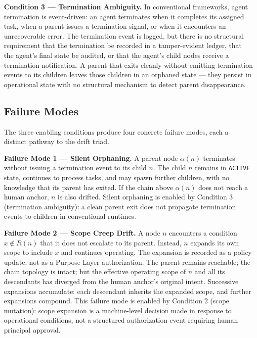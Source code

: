 \medskip
\noindent\textbf{Condition 3 — Termination Ambiguity.}
In conventional frameworks, agent termination is event-driven: an agent terminates when it completes its assigned task, when a parent issues a termination signal, or when it encounters an unrecoverable error. The termination event is logged, but there is no structural requirement that the termination be recorded in a tamper-evident ledger, that the agent's final state be audited, or that the agent's child nodes receive a termination notification. A parent that exits cleanly without emitting termination events to its children leaves those children in an orphaned state — they persist in operational state with no structural mechanism to detect parent disappearance.

\subsection{Failure Modes}
\label{sec:drift-failure-modes}

The three enabling conditions produce four concrete failure modes, each a distinct pathway to the drift triad.

\medskip
\noindent\textbf{Failure Mode 1 — Silent Orphaning.}
A parent node $\alpha(n)$ terminates without issuing a termination event to its child $n$. The child $n$ remains in \texttt{ACTIVE} state, continues to process tasks, and may spawn further children, with no knowledge that its parent has exited. If the chain above $\alpha(n)$ does not reach a human anchor, $n$ is also drifted. Silent orphaning is enabled by Condition 3 (termination ambiguity): a clean parent exit does not propagate termination events to children in conventional runtimes.

\medskip
\noindent\textbf{Failure Mode 2 — Scope Creep Drift.}
A node $n$ encounters a condition $x \notin R(n)$ that it does not escalate to its parent. Instead, $n$ expands its own scope to include $x$ and continues operating. The expansion is recorded as a policy update, not as a Purpose Layer authorization. The parent remains reachable; the chain topology is intact; but the effective operating scope of $n$ and all its descendants has diverged from the human anchor's original intent. Successive expansions accumulate: each descendant inherits the expanded scope, and further expansions compound. This failure mode is enabled by Condition 2 (scope mutation): scope expansion is a machine-level decision made in response to operational conditions, not a structured authorization event requiring human principal approval.

